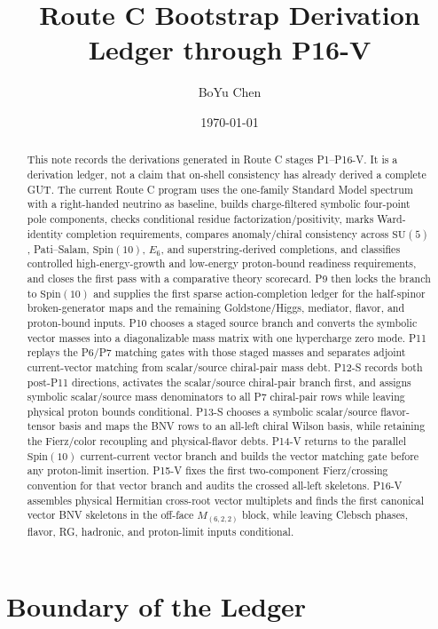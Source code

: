 \documentclass[11pt]{article}
\title{Route C Bootstrap Derivation Ledger through P16-V}
\author{BoYu Chen}
\date{\today}
\newcommand{\SU}{\mathrm{SU}}
\newcommand{\Spin}{\mathrm{Spin}}
\begin{document}
\maketitle

\begin{abstract}
This note records the derivations generated in Route C stages P1--P16-V.
It is a derivation ledger, not a claim that on-shell consistency has already
derived a complete GUT.  The current Route C program uses the one-family
Standard Model spectrum with a right-handed neutrino as baseline, builds
charge-filtered symbolic four-point pole components, checks conditional
residue factorization/positivity, marks Ward-identity completion requirements,
compares anomaly/chiral consistency across $\SU(5)$, Pati--Salam,
$\Spin(10)$, $E_6$, and superstring-derived completions, and classifies
controlled high-energy-growth and low-energy proton-bound readiness
requirements, and closes the first pass with a comparative theory scorecard.
P9 then locks the branch to $\Spin(10)$ and supplies the first sparse
action-completion ledger for the half-spinor broken-generator maps and the
remaining Goldstone/Higgs, mediator, flavor, and proton-bound inputs.
P10 chooses a staged source branch and converts the symbolic vector masses into
a diagonalizable mass matrix with one hypercharge zero mode.
P11 replays the P6/P7 matching gates with those staged masses and separates
adjoint current-vector matching from scalar/source chiral-pair mass debt.
P12-S records both post-P11 directions, activates the scalar/source
chiral-pair branch first, and assigns symbolic scalar/source mass denominators
to all P7 chiral-pair rows while leaving physical proton bounds conditional.
P13-S chooses a symbolic scalar/source flavor-tensor basis and maps the BNV
rows to an all-left chiral Wilson basis, while retaining the Fierz/color
recoupling and physical-flavor debts.
P14-V returns to the parallel $\Spin(10)$ current-current vector branch and
builds the vector matching gate before any proton-limit insertion.
P15-V fixes the first two-component Fierz/crossing convention for that vector
branch and audits the crossed all-left skeletons.
P16-V assembles physical Hermitian cross-root vector multiplets and finds the
first canonical vector BNV skeletons in the off-face $M_{(6,2,2)}$ block, while
leaving Clebsch phases, flavor, RG, hadronic, and proton-limit inputs
conditional.
\end{abstract}

\section{Boundary of the Ledger}
\end{document}
